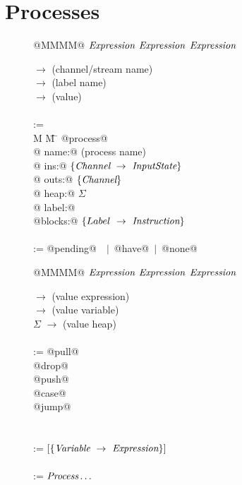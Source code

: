 \section{Processes}
\label{s:Processes}


\begin{figure}
\begin{minipage}[t]{0.4\textwidth}
\begin{tabbing}
\Instr \TABDEF @MMMM@  \TABSKIP $\textit{Expression}$ \TABSKIP $\textit{Expression}$ \TABSKIP $\textit{Expression}$ \kill

\Chan \> $\to$ \> (channel/stream name) \\
\Label \> $\to$ \> (label name) \\
\Value \> $\to$ \> (value) \\
\\

\Proc \>:=\> \\
M \= M \= \kill
\> @process@ \\
\> \> @  name:@  (process name) \\
\> \> @   ins:@  $\{\textit{Channel} ~\to~ \textit{InputState}\}$ \\
\> \> @  outs:@  $\{ \textit{Channel} \}$ \\
\> \> @  heap:@  $\Sigma$ \\
\> \> @ label:@  \Label \\
\> \> @blocks:@  $\{Label ~\to~ \textit{Instruction}\}$ \\
\\
\Instr \TABDEF \kill
\InputState \> := \> @pending@~\Value~$|$~@have@~$|$~@none@

\end{tabbing}
\end{minipage}
\begin{minipage}[t]{0.05\textwidth}
\quad
\end{minipage}
\begin{minipage}[t]{0.4\textwidth}
\begin{tabbing}
\Instr \TABDEF @MMMM@  \TABSKIP $\textit{Expression}$ \TABSKIP $\textit{Expression}$ \TABSKIP $\textit{Expression}$ \kill

\Exp \> $\to$ \> (value expression) \\
\Var \> $\to$ \> (value variable) \\
$\Sigma$ \> $\to$ \> (value heap) \\
\\

\Instr
    \> :=\> @pull@  \> \Chan  \> \Var  \> \Goto \\
    \TABALT @drop@  \> \Chan  \>       \> \Goto \\
    \TABALT @push@  \> \Chan  \> \Exp  \> \Goto \\
    \TABALT @case@  \> \Exp   \> \Goto \> \Goto \\
    \TABALT @jump@  \>        \>       \> \Goto \\
\\
\\
\Goto \> := \> \Label $[\{\textit{Variable} ~\to~ \textit{Expression}\}]$ \\
\\
\Nest \> := \> $\textit{Process}\ldots$ \\
\end{tabbing}
\end{minipage}


\end{figure}
